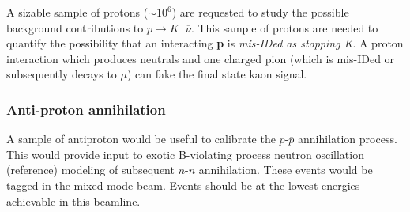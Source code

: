 A sizable sample of protons ($\sim 10^6$)
are requested to study the possible background contributions to  $p \rightarrow K^+ \overline{\nu}$.
This sample of  protons are needed to quantify the possibility that an interacting {\bf p} 
is  {\em mis-IDed as stopping K}. A proton interaction which produces neutrals and one charged pion 
(which is mis-IDed or subsequently decays to $\mu$) can fake the final state kaon signal.


\subsubsection{Anti-proton annihilation }

A sample of antiproton would be useful to calibrate the $p$-$\overline{p}$ annihilation process. 
This would provide input to exotic B-violating process neutron oscillation (reference) modeling of 
subsequent  $n$-$\overline{n}$ annihilation. These events would be tagged in the mixed-mode beam.
Events should be at the lowest energies achievable in this beamline.



